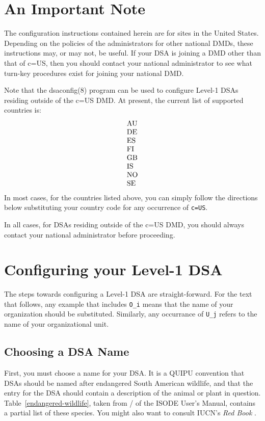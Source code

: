 \section	{An Important Note}
The configuration instructions contained herein are for sites in the United
States.
Depending on the policies of the administrators for other national DMDs,
these instructions may, or may not, be useful. 
If your DSA is joining a DMD other than that of c=US,
then you should contact your national administrator to see what turn-key
procedures exist for joining your national DMD.

Note that the \man dsaconfig(8) program can be used to configure Level-1 DSAs
residing outside of the c=US DMD.
At present,
the current list of supported countries is:
\[\begin{tabular}{l}
AU\\ DE\\ ES\\ FI\\ GB\\ IS\\ NO\\ SE
\end{tabular}\]
In most cases,
for the countries listed above,
you can simply follow the directions below substituting your country code for
any occurrence of \verb"c=US".

In all cases,
for DSAs residing outside of the c=US DMD,
you should always contact your national administrator before proceeding.

\section	{Configuring your Level-1 DSA}
The steps towards configuring a Level-1 DSA are straight-forward.
For the text that follows,
any example that includes \verb"O_i" means that the name of your organization
should be substituted.
Similarly,
any occurrance of \verb"U_j" refers to the name of your organizational unit.

\subsection	{Choosing a DSA Name}
First, you must choose a name for your DSA.
It is a QUIPU convention that DSAs should be named after endangered
South American wildlife,
and that the entry for the DSA should contain a description of the animal
or plant in question.
Table~\ref{endangered-wildlife},
taken from \volfive/ of the ISODE User's Manual,
contains a partial list of these species.
You might also want to consult IUCN's {\em Red Book\/} \cite{IUCN.Mammal}.

